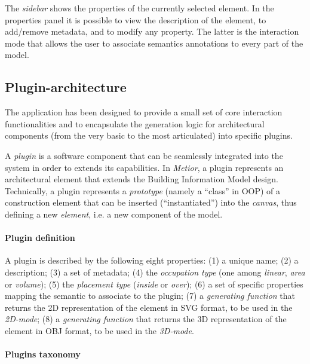 The \emph{sidebar} shows the properties of the currently selected element.
In the properties panel it is possible to view the description of the element, to add/remove metadata, and to modify any property. The latter is the interaction mode that allows the user to associate semantics annotations to every part of the model.

\subsection{Plugin-architecture}

\noindent
The application has been designed to provide a small set of core interaction functionalities and to encapsulate the generation logic for architectural components (from the very basic to the most articulated) into specific plugins.

A \emph{plugin} is a software component that can be seamlessly integrated into the system in order to extends its capabilities.
In \emph{Metior}, a plugin represents an architectural element that extends the Building Information Model design.
Technically, a plugin represents a \emph{prototype} (namely a ``class'' in OOP) of a construction element that can be inserted (``instantiated'') into the \emph{canvas}, thus defining a new \emph{element}, i.e. a new component of the model.

\paragraph{Plugin definition}

\noindent
A plugin is described by the following eight properties: (1) a unique name; (2) a description; (3) a set of metadata; (4) the \emph{occupation type} (one among \emph{linear}, \emph{area} or \emph{volume}); (5) the \emph{placement type} (\emph{inside} or \emph{over}); (6) a set of specific properties mapping the semantic to associate to the plugin; (7) a \emph{generating function} that returns the 2D representation of the element in SVG format, to be used in the \emph{2D-mode}; (8) a \emph{generating function} that returns the 3D representation of the element in OBJ format, to be used in the \emph{3D-mode}.

\paragraph{Plugins taxonomy}
\label{ssec:taxonomy}

